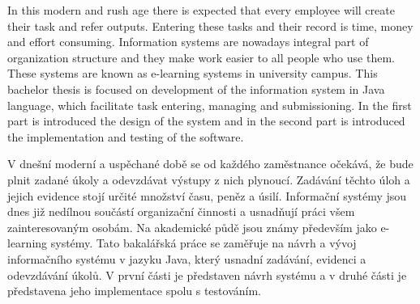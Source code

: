 \documentclass[11pt,twoside,a4paper]{book}
\begin{document}



 
\abstractpage

In this modern and rush age there is expected that every employee will create their task and refer outputs. Entering these tasks and their record is time, money and effort consuming. Information systems are nowadays integral part of organization structure and they make work easier to all people who use them. These systems are known as e-learning systems in university campus. This bachelor thesis is focused on  development of the information system in Java language, which facilitate task entering, managing and submissioning. In the first part is introduced the design of the system and in the second part is introduced the implementation and testing of the software.


\baselineskip

\noindent
V dnešní moderní a uspěchané době se od každého zaměstnance očekává, že bude plnit zadané úkoly a odevzdávat výstupy z nich plynoucí. Zadávání těchto úloh a jejich evidence stojí určité množství času, peněz a úsilí. Informační systémy jsou dnes již nedílnou součástí organizační činnosti a usnadňují práci všem zainteresovaným osobám. Na akademické půdě jsou známy především jako e-learning systémy. Tato bakalářská práce se zaměřuje na návrh a vývoj informačního systému v jazyku Java, který usnadní zadávání, evidenci a odevzdávání úkolů. V první části je představen návrh systému a v druhé části je představena jeho implementace spolu s testováním.  


\tableofcontents



\listoffigures



\listoftables
\renewcommand\lstlistingname{Část zdrojového kódu}
\renewcommand\lstlistlistingname{Seznam částí zdrojových kódů}
\lstlistoflistings
\end{document}
